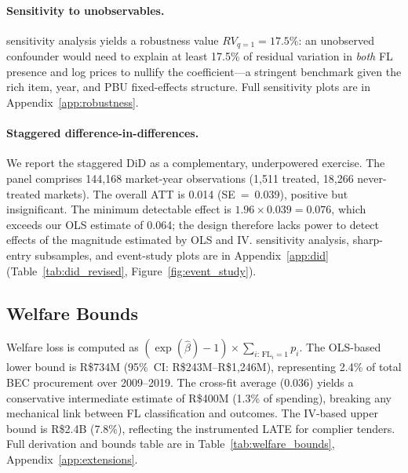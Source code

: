 \paragraph{Sensitivity to unobservables.}
\citet{cinelli2020making} sensitivity analysis yields a robustness
value $RV_{q=1} = 17.5\%$: an unobserved confounder would need to
explain at least 17.5\% of residual variation in \emph{both} FL
presence and log prices to nullify the coefficient---a stringent
benchmark given the rich item, year, and PBU fixed-effects structure.
Full sensitivity plots are in Appendix~\ref{app:robustness}.

\paragraph{Staggered difference-in-differences.}
We report the \citet{callaway2021difference} staggered DiD as a
complementary, underpowered exercise. The panel comprises 144,168
market-year observations (1,511 treated, 18,266 never-treated
markets). The overall ATT is 0.014 (SE~=~0.039), positive but
insignificant. The minimum detectable effect is
$1.96\times 0.039 = 0.076$, which exceeds our OLS estimate of 0.064;
the design therefore lacks power to detect effects of the magnitude
estimated by OLS and IV. \citet{rambachan2023more} sensitivity
analysis, sharp-entry subsamples, and event-study plots are in
Appendix~\ref{app:did} (Table~\ref{tab:did_revised},
Figure~\ref{fig:event_study}).

\subsection{Welfare Bounds}
\label{sec:welfare}

Welfare loss is computed as $(\exp(\hat{\beta})-1)\times\sum_{i:\,\text{FL}_i=1}p_i$.
The OLS-based lower bound is R\$734M (95\%~CI: R\$243M--R\$1,246M),
representing 2.4\% of total BEC procurement over 2009--2019. The
cross-fit average (0.036) yields a conservative intermediate estimate
of R\$400M (1.3\% of spending), breaking any mechanical link between
FL classification and outcomes. The IV-based upper bound is
R\$2.4B (7.8\%), reflecting the instrumented LATE for complier
tenders. Full derivation and bounds table are in
Table~\ref{tab:welfare_bounds}, Appendix~\ref{app:extensions}.

